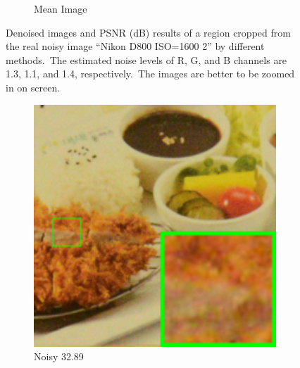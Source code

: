 \begin{figure}
\begin{subfigure}[t]{0.19\textwidth}
		\caption{Mean Image}
    \end{subfigure}
    \caption{Denoised images and PSNR (dB) results of a region cropped from the real noisy image ``Nikon D800 ISO=1600 2'' \cite{crosschannel2016} by different methods.\ The estimated noise levels of R, G, and B channels are 1.3, 1.1, and 1.4, respectively.\ The images are better to be zoomed in on screen.}
    \label{fig4-16}
\end{figure}


\begin{figure}
    \centering
    \begin{subfigure}[t]{0.19\textwidth}
        \centering
        \includegraphics[width=1\textwidth]{images/mcwnnm/cc/resize_br_Noisy_d800_iso3200_2.png}
		\caption{Noisy 32.89}
    \end{subfigure}
    \hfill
    \begin{subfigure}[t]{0.19\textwidth}
        \centering

\end{subfigure}
\end{figure}
